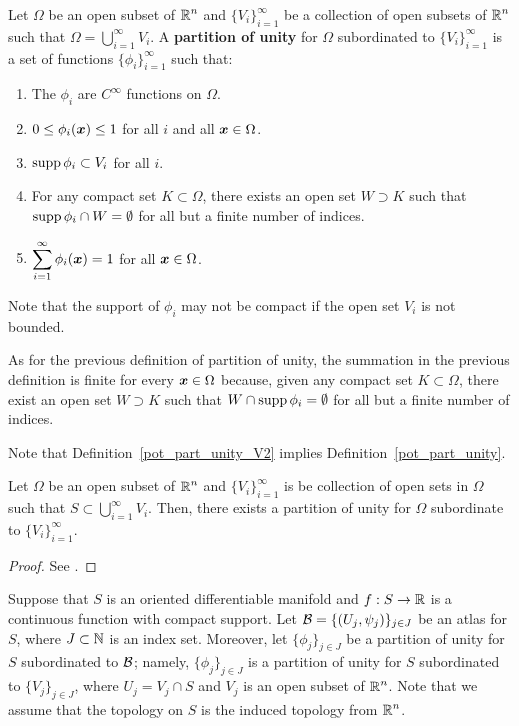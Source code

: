 \begin{defn} \label{pot_part_unity_V2}
Let $\Omega$ be an open subset of $\displaystyle \mathbb{R}^n$ and
$\displaystyle \{V_i\}_{i=1}^\infty$
be a collection of open subsets of $\displaystyle \mathbb{R}^n$ such that
$\displaystyle \Omega = \bigcup_{i=1}^\infty V_i$.
A {\bfseries partition of unity}
for $\Omega$ subordinated to $\displaystyle \{V_i\}_{i=1}^\infty$ is a
set of functions $\displaystyle \{\phi_i\}_{i=1}^\infty$ such that:
\begin{enumerate}
\item The $\phi_i$ are $\displaystyle C^\infty$ functions on $\Omega$.
\item $0 \leq \phi_i({\bm{x}}) \leq 1$ for all $i$ and all ${\bm{x}} \in \Omega$.
\item $\operatorname{supp} \phi_i \subset V_i$ for all $i$.
\item For any compact set $K \subset \Omega$, there exists an open set
$W \supset K$ such that $\operatorname{supp} \phi_i \cap W = \emptyset$ for all but
a finite number of indices.
\item $\displaystyle \sum_{i=1}^\infty \phi_i({\bm{x}}) = 1$ for all
${\bm{x}}\in \Omega$.
\end{enumerate}
Note that the support of $\phi_i$ may not be compact if the open set
$V_i$ is not bounded.
\end{defn}

As for the previous definition of partition of unity,
the summation in the previous definition is finite for every
${\bm{x}} \in \Omega$ because, given any compact set $K\subset \Omega$,
there exist an open set $W \supset K$ such that
$W \cap \operatorname{supp} \phi_i = \emptyset$ for all but a finite number of indices.

Note that Definition~\ref{pot_part_unity_V2} implies
Definition~\ref{pot_part_unity}.

\begin{prop}
Let $\Omega$ be an open subset of $\displaystyle \mathbb{R}^n$ and
$\displaystyle \{ V_i\}_{i=1}^\infty$ is be collection
of open sets in $\Omega$ such that
$\displaystyle S \subset \bigcup_{i=1}^\infty V_i$.
Then, there exists a partition of unity for $\Omega$
subordinate to $\displaystyle \{ V_i\}_{i=1}^\infty$.
\end{prop}

\begin{proof}
See \cite{RuFA}. 
\end{proof}

Suppose that $S$ is an oriented differentiable manifold and
$f:S \rightarrow \mathbb{R}$ is a
continuous function with compact support.  Let
$\displaystyle \mathcal{B} = \{ (U_j, \psi_j) \}_{j\in J}$ be an atlas for
$S$, where $J \subset \mathbb{N}$ is an index set.
Moreover, let $\displaystyle \{ \phi_j \}_{j\in J}$ be a partition of unity
for $S$ subordinated to $\mathcal{B}$; namely,
$\displaystyle \{ \phi_j \}_{j\in J}$ is a partition of unity for $S$
subordinated to $\displaystyle \{ V_j \}_{j\in J}$,
where $U_j = V_j \cap S$ and $V_j$ is an open subset of
$\displaystyle \mathbb{R}^n$.  Note 
that we assume that the topology on $S$ is the induced topology from
$\displaystyle \mathbb{R}^n$.

